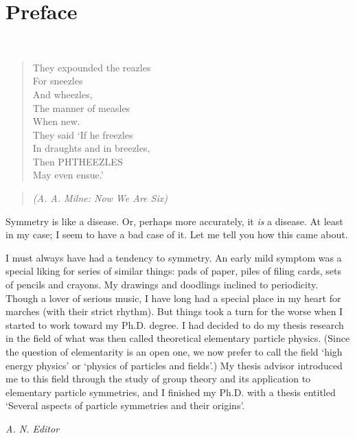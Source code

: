 \cleardoublepage
\chapter*{Preface}

\begin{center}
 \mbox{}\\[-6.5pt]
 \begin{minipage}{12pc}
   \begin{verse}
    They expounded the reazles\\
    For sneezles\\
    And wheezles,\\
    The manner of measles\\
    When new.\\
    They said `If he freezles\\
    In draughts and in breezles,\\
    Then PHTHEEZLES\\
    May even ensue.'
  \end{verse}
 \end{minipage}
\end{center}
\begin{quote}\centering
 \vspace{-4.3pt}
 {\it (A. A. Milne: Now We Are Six)\phantom{ix))i}}
\end{quote}
Symmetry is like a disease. Or, perhaps more accurately, it
{\it is\/} a disease. At least in my case; I seem to have
a bad case of it. Let me tell you how this came about.

I must always have had a tendency to symmetry. An early mild
symptom was a special liking for series of similar things:
pads of paper, piles of filing cards, sets of pencils and crayons.
My drawings and doodlings inclined to periodicity. Though a lover
of serious music, I have long had a special place in my heart for
marches (with their strict rhythm). But things took a turn for the
worse when I started to work toward my Ph.D. degree. I had decided
to do my thesis research in the field of what was then called
theoretical elementary particle physics. (Since the question of
elementarity is an open one, we now prefer to call the field
`high energy physics' or `physics of particles
and fields'.) My thesis advisor introduced me to this field
through the study of group theory and its application to elementary
particle symmetries, and I finished my Ph.D.  with a thesis entitled
`Several aspects of particle symmetries and their origins'.
\begin{flushright}\it
  A. N. Editor
\end{flushright}

